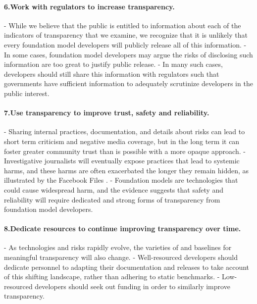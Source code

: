 \paragraph{6.\phantom{X}Work with regulators to increase transparency.} 
-  While we believe that the public is entitled to information about each of the indicators of transparency that we examine, we recognize that it is unlikely that every foundation model developers will publicly release all of this information.
- In some cases, foundation model developers may argue the risks of disclosing such information are too great to justify public release.
- In many such cases, developers should still share this information with regulators such that governments have sufficient information to adequately scrutinize developers in the public interest.
\paragraph{7.\phantom{X}Use transparency to improve trust, safety and reliability.} 
-  Sharing internal practices, documentation, and details about risks can lead to short term criticism and negative media coverage, but in the long term it can foster greater community trust than is possible with a more opaque approach.
- Investigative journalists will eventually expose practices that lead to systemic harms, and these harms are often exacerbated the longer they remain hidden, as illustrated by the Facebook Files \cite{wsj2021fb}.
- Foundation models are technologies that could cause widespread harm, and the evidence suggests that safety and reliability will require dedicated and strong forms of transparency from foundation model developers. \clearpage
\paragraph{8.\phantom{X}Dedicate resources to continue improving transparency over time.} 
-  As technologies and risks rapidly evolve, the varieties of and baselines for meaningful transparency will also change.
- Well-resourced developers should dedicate personnel to adapting their documentation and releases to take account of this shifting landscape, rather than adhering to static benchmarks.
- Low-resourced developers should seek out funding in order to similarly improve transparency.

